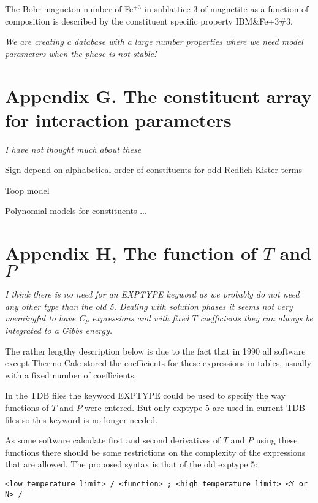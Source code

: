 \documentclass[12pt]{article}
\begin{document}
The Bohr magneton number of Fe$^{+3}$ in sublattice 3 of magnetite as
a function of composition is described by the constituent specific
property IBM\&Fe+3\#3.

{\em We are creating a database with a large number properties where we
need model parameters when the phase is not stable!}

\newpage

\section{Appendix G.  The constituent array for interaction parameters}

{\em I have not thought much about these}

Sign depend on alphabetical order of constituents for odd
Redlich-Kister terms

Toop model

Polynomial models for constituents ...

\newpage

\section{Appendix H, The function of $T$ and $P$}\label{sec:exptype}

{\em I think there is no need for an EXPTYPE keyword as we probably do
  not need any other type than the old 5.  Dealing with solution
  phases it seems not very meaningful to have C$_P$ expressions and
  with fixed $T$ coefficients they can always be integrated to a Gibbs
  energy.

  The rather lengthy description below is due to the fact that in 1990
  all software except Thermo-Calc stored the coefficients for these
  expressions in tables, usually with a fixed number of coefficients.}

In the TDB files the keyword EXPTYPE could be used to specify the way
functions of $T$ and $P$ were entered.  But only exptype 5 are used in
current TDB files so this keyword is no longer needed.

As some software calculate first and second derivatives of $T$ and $P$
using these functions there should be some restrictions on the
complexity of the expressions that are allowed.  The proposed syntax
is that of the old exptype 5:

\begin{verbatim}
<low temperature limit> / <function> ; <high temperature limit> <Y or N> /
\end{verbatim}
\end{document}
